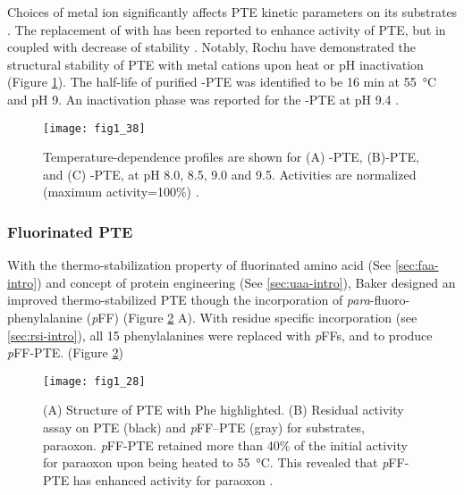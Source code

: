 \begin{refsection}
Choices of metal ion significantly affects PTE kinetic parameters on its
substrates \cite{Hanusa2011,Perezgasga2012,Carletti2009}. The replacement of
 with  has been reported to enhance activity of PTE,
but in coupled with decrease of stability \cite{Rochu2004}. Notably, Rochu
 have demonstrated the structural stability of PTE with metal
cations upon heat or pH inactivation \cite{Rochu2004} (Figure
\ref{fig:metal-effect}). The half-life of purified 
-PTE was identified to be 16 min at \SI{55}{\celsius} and pH 9. An inactivation
phase was reported for the -PTE at pH 9.4 \cite{Rochu2004}. 
\begin{figure}[htbp] \centering \texttt{[image: fig1\_38]}
    \caption[Temperature-dependence profiles are shown for (A)
    -PTE, (B)-PTE, and (C) -PTE, at pH 8.0,
8.5, 9.0 and 9.5. Activities are normalized (maximum
activity=100\%).]{Temperature-dependence profiles are shown for (A)
    -PTE, (B)-PTE, and (C) -PTE, at pH 8.0,
    8.5, 9.0 and 9.5. Activities are normalized (maximum activity=100\%)
    \cite{Rochu2004}.}
    \label{fig:metal-effect}
\end{figure}

\subsubsection{Fluorinated PTE}

With the thermo-stabilization property of fluorinated amino acid (See
\ref{sec:faa-intro}) and concept of protein engineering (See \ref{sec:uaa-intro}),
Baker  designed an improved thermo-stabilized PTE though the
incorporation of \emph{para}-fluoro-phenylalanine (\emph{p}FF)
\cite{Baker2011b} (Figure \ref{fig:PJB} A). With residue specific incorporation
(see \ref{sec:rsi-intro}), all 15 phenylalanines were replaced with \emph{p}FFs,
and to produce \emph{p}FF-PTE. (Figure \ref{fig:PJB})
\begin{figure}[htbp] \centering \texttt{[image: fig1\_28]}
    \caption[(A) Structure of PTE with Phe highlighted. (B) Residual activity
        assay on PTE (black) and \emph{p}FF-PTE (gray) for substrates,
        paraoxon. \emph{p}FF-PTE retained more than 40\% of the initial
        activity for paraoxon upon being heated to \SI{55}{\celsius}. This
        revealed that \emph{p}FF-PTE has enhanced activity for paraoxon.]{(A)
            Structure of PTE with Phe highlighted. (B) Residual activity assay
            on PTE (black) and \emph{p}FF--PTE (gray) for substrates, paraoxon.
            \emph{p}FF-PTE retained more than 40\% of the initial activity for
            paraoxon upon being heated to \SI{55}{\celsius}. This revealed that
            \emph{p}FF-PTE has enhanced activity for paraoxon
            \cite{Baker2011b}.} 
    \label{fig:PJB} 
\end{figure}


\end{refsection}
